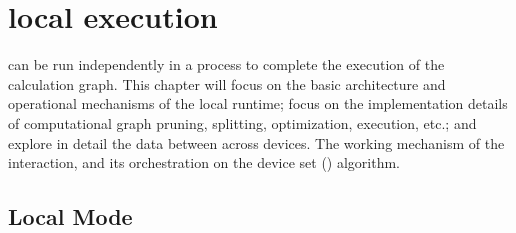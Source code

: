 \begin{savequote}[45mm]
\end{savequote}

\chapter{local execution} 
\label{ch:local}

\begin{content}

\tf{} can be run independently in a process to complete the execution of the calculation graph. This chapter will focus on the basic architecture and operational mechanisms of the local runtime; focus on the implementation details of computational graph pruning, splitting, optimization, execution, etc.; and explore in detail the data between  across devices. The working mechanism of the interaction, and its  orchestration on the device set () algorithm.

\end{content}

\section{Local Mode}
\label{sec:local-runtime}

